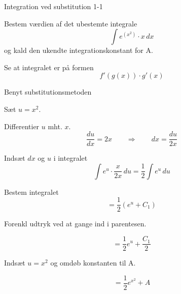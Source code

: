 \documentclass{article}
\begin{document}
\tableofcontents


\begin{exercise}{Integration ved substitution 1-1}
	
	
	Bestem værdien af det ubestemte integrale
	\[
	\int e^{(x^2)} \cdot x \, dx
	\]
	og kald den ukendte integrationskonstant for A.
	
	
	
	
	\hint
	
	Se at integralet er på formen
	\[
	f'(g(x)) \cdot g'(x)
	\]
	
	\hint
	
	Benyt substitutionsmetoden
	
	\hint
	
	Sæt $u=x^2$.
	
	
	\hint
	
	Differentier $u$ mht. $x$.
	\[
	\frac{du}{dx} = 2x \qquad	\Rightarrow \qquad dx = \frac{du}{2x}
	\]
	
	\hint
	
	Indsæt $dx$ og $u$ i integralet
	\[
	\int e^{u} \cdot \frac{x}{2x} \, du = \frac{1}{2} \int e^u \, du
	\]
	
	\hint
	
	Bestem integralet
	\[
	= \frac{1}{2} \left( e^u + C_1 \right)
	\]
	
	\hint
	Forenkl udtryk ved at gange ind i parentesen.
	
	\hint
	
	\[
	= \frac{1}{2} e^u + \frac{C_1}{2}
	\]
	
	\hint
	
	Indsæt $u = x^2$ og omdøb konstanten  til A.
	
	\hint
	
	\[
	= \frac{1}{2} e^{x^2} + A
	\]
	
	
\end{exercise}

\newpage
\end{document}
